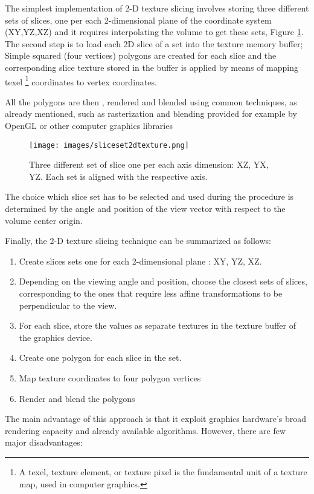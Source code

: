 \documentclass[12pt,a4paper]{extarticle}
\newcommand{\linespace}{\vspace{0pt}}
\begin{document}
The simplest implementation of 2-D texture slicing involves storing three different sets of slices, one per each 2-dimensional plane of the coordinate system (XY,YZ,XZ) and it requires interpolating the volume to get these sets, Figure \ref{fig:slicingset2dtexture}.
The second step is to load each 2D slice of a set into the texture memory buffer;  Simple squared (four vertices) polygons are created for each slice and the corresponding slice texture stored in the buffer is applied by means of mapping texel \footnote{A texel, texture element, or texture pixel is the fundamental unit of a texture map,\cite{glassner1989an} used in computer graphics.} coordinates to vertex coordinates.

All the polygons are then , rendered and blended using common techniques, as already mentioned, such as rasterization and blending provided for example by OpenGL or other computer graphics libraries

\begin{figure}[hbtp]
\centering
\texttt{[image: images/sliceset2dtexture.png]}
\caption{Three different set of slice one per each axis dimension: XZ, YX, YZ. Each set is aligned with the respective axis.}
\label{fig:slicingset2dtexture}
\end{figure}


The choice which slice set has to be selected and used during the procedure is determined by the angle and position of the view vector with respect to the volume center origin.

Finally, the 2-D texture slicing technique can be summarized as follows:
\begin{enumerate}
\item Create slices sets one for each 2-dimensional plane : XY, YZ, XZ.
\item Depending on the viewing angle and position, choose the closest sets of slices, corresponding to the ones that require less affine transformations to be perpendicular to the view.
\item For each slice, store the values as separate textures in the texture buffer of the graphics device.
\item Create one polygon for each slice in the set.
\item Map texture coordinates to four polygon vertices
\item Render and blend the polygons
\end{enumerate}
\linespace

The main advantage of this approach is that it exploit graphics hardware's broad rendering capacity and already available algorithms. However, there are few major disadvantages: 
\end{document}
